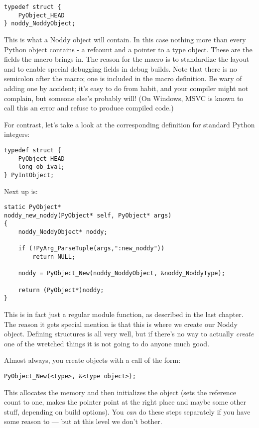 \begin{verbatim}
typedef struct {
    PyObject_HEAD
} noddy_NoddyObject;
\end{verbatim}

This is what a Noddy object will contain.  In this case nothing more
than every Python object contains - a refcount and a pointer to a type
object.  These are the fields the  macro brings
in.  The reason for the macro is to standardize the layout and to
enable special debugging fields in debug builds.  Note that there is
no semicolon after the  macro; one is included in
the macro definition.  Be wary of adding one by accident; it's easy to
do from habit, and your compiler might not complain, but someone
else's probably will!  (On Windows, MSVC is known to call this an
error and refuse to produce compiled code.)

For contrast, let's take a look at the corresponding definition for
standard Python integers:

\begin{verbatim}
typedef struct {
    PyObject_HEAD
    long ob_ival;
} PyIntObject;
\end{verbatim}

Next up is:

\begin{verbatim}
static PyObject*
noddy_new_noddy(PyObject* self, PyObject* args)
{
    noddy_NoddyObject* noddy;

    if (!PyArg_ParseTuple(args,":new_noddy")) 
        return NULL;

    noddy = PyObject_New(noddy_NoddyObject, &noddy_NoddyType);

    return (PyObject*)noddy;
}
\end{verbatim}

This is in fact just a regular module function, as described in the
last chapter.  The reason it gets special mention is that this is
where we create our Noddy object.  Defining 
structures is all very well, but if there's no way to actually
\emph{create} one of the wretched things it is not going to do anyone
much good.

Almost always, you create objects with a call of the form:

\begin{verbatim}
PyObject_New(<type>, &<type object>);
\end{verbatim}

This allocates the memory and then initializes the object (sets
the reference count to one, makes the  pointer point at
the right place and maybe some other stuff, depending on build options).
You \emph{can} do these steps separately if you have some reason to
--- but at this level we don't bother.

